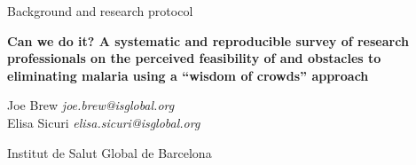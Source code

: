 \documentclass{article}
\begin{document}


\vspace{20mm}


\begin{Large}
\begin{center}
Background and research protocol
\end{center}
\end{Large}


\begin{large}
\begin{center}
\textbf{Can we do it? A systematic and reproducible survey of research professionals on the perceived feasibility of and obstacles to eliminating malaria using a “wisdom of crowds” approach} 
\end{center}
\end{large}


\vspace{5mm}

\begin{changemargin}{2.5cm}{2.5cm} 
\begin{center}
\begin{large}
Joe Brew \hfill \emph{joe.brew@isglobal.org} \\
Elisa Sicuri \hfill \emph{elisa.sicuri@isglobal.org} \\ 
\end{large}
\end{center}
\end{changemargin}


\vspace{6mm}

\begin{center}
\begin{large}
Institut de Salut Global de Barcelona 
\end{large}
\end{center}
\end{document}
